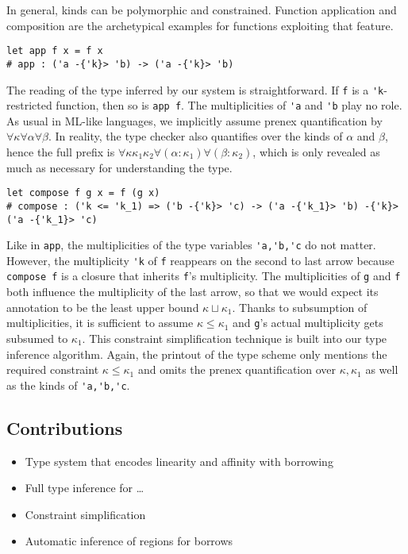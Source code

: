 In general, kinds can be polymorphic and constrained. Function
application and composition are the archetypical
examples for functions exploiting that feature.
\begin{lstlisting}
let app f x = f x
# app : ('a -{'k}> 'b) -> ('a -{'k}> 'b)
\end{lstlisting}
The reading of the type inferred by our system is straightforward. If
\lstinline/f/ is a \lstinline/'k/-restricted function, then so is
\lstinline/app f/. The multiplicities of \lstinline/'a/ and
\lstinline/'b/ play no role. As usual in ML-like languages, we
implicitly assume prenex quantification by
$\forall\kappa\forall\alpha\forall\beta$. In reality, the
type checker also quantifies over the kinds of $\alpha$ and $\beta$,
hence the full prefix is
$\forall\kappa\kappa_1\kappa_2\forall(\alpha:\kappa_1)\forall(\beta:\kappa_2)$,
which is only revealed as much as necessary for understanding the type. 
\begin{lstlisting}
let compose f g x = f (g x) 
# compose : ('k <= 'k_1) => ('b -{'k}> 'c) -> ('a -{'k_1}> 'b) -{'k}> ('a -{'k_1}> 'c)
\end{lstlisting}
Like in \lstinline/app/, the multiplicities of the type variables
\lstinline/'a,'b,'c/ do not matter. However, the multiplicity
\lstinline/'k/ of \lstinline/f/ reappears on the second to last arrow
because \lstinline/compose f/ is a closure that inherits
\lstinline/f/'s multiplicity. The multiplicities of \lstinline/g/  and
\lstinline/f/ both influence the multiplicity of the last arrow, so
that we would expect its annotation to be the least upper bound
$\kappa \sqcup \kappa_1$. Thanks to subsumption of multiplicities, it
is sufficient to assume $\kappa \le \kappa_1$ and \lstinline/g/'s
actual multiplicity gets subsumed to $\kappa_1$. This constraint
simplification technique is built into our type inference algorithm. Again, the printout
of the type scheme only mentions the required constraint
$\kappa\le\kappa_1$ and omits the prenex quantification over $\kappa,
\kappa_1$ as well as the kinds of \lstinline/'a,'b,'c/.

\subsection{Contributions}
\label{sec:contributions}

\begin{itemize}
\item Type system that encodes linearity and affinity with borrowing
\item Full type inference for \dots
\item Constraint simplification
\item Automatic inference of regions for borrows
\end{itemize}

